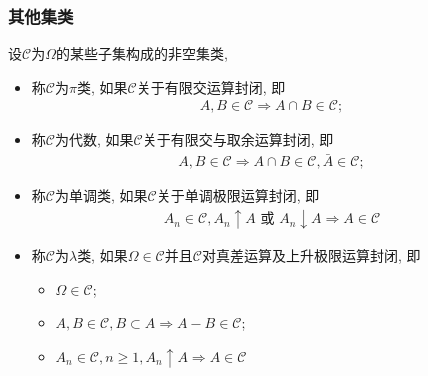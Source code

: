 \begin{frame}
	\frametitle{其他集类}
	\begin{defi}
	  设$\mathcal{C}$为$\Omega$的某些子集构成的非空集类,
	  \begin{itemize}[<+-|alert@+>]
	  \item 称$\mathcal{C}$为$\pi$类, 如果$\mathcal{C}$关于有限交运算封闭, 即
		\begin{eqnarray*}
		  A,B\in \mathcal{C}\Rightarrow A\cap B\in \mathcal{C};
		\end{eqnarray*}
	  \item 称$\mathcal{C}$为代数, 如果$\mathcal{C}$关于有限交与取余运算封闭, 即
		\begin{eqnarray*}
		  A,B\in \mathcal{C}\Rightarrow A\cap B\in \mathcal{C}, \bar{A}\in \mathcal{C};
		\end{eqnarray*}
	  \item 称$\mathcal{C}$为单调类, 如果$\mathcal{C}$关于单调极限运算封闭, 即
		\begin{eqnarray*}
		  A_n\in \mathcal{C}, A_n\uparrow A \mbox{ 或 } A_n\downarrow A \Rightarrow A\in \mathcal{C}
		\end{eqnarray*}
	  \item 称$\mathcal{C}$为$\lambda$类, 如果$\Omega\in \mathcal{C}$并且$\mathcal{C}$对真差运算及上升极限运算封闭, 即
		\begin{itemize}
		\item $\Omega\in \mathcal{C}$;
		\item $A, B\in \mathcal{C}, B\subset A\Rightarrow A-B\in \mathcal{C}$;
		\item $A_n\in \mathcal{C}, n\geq 1, A_n\uparrow A\Rightarrow A\in \mathcal{C}$
		\end{itemize}

	  \end{itemize}

	\end{defi}
  \end{frame}

